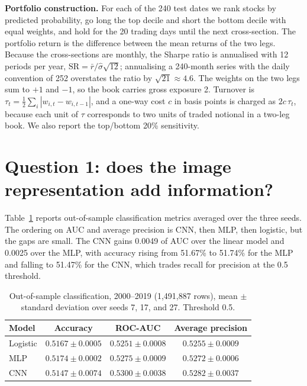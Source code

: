\documentclass[10pt]{article}
\begin{document}
\textbf{Portfolio construction.} For each of the 240 test dates we rank stocks by predicted probability, go long the top decile and short the bottom decile with equal weights, and hold for the 20 trading days until the next cross-section. The portfolio return is the difference between the mean returns of the two legs. Because the cross-sections are monthly, the Sharpe ratio is annualised with 12 periods per year, $\text{SR}=\bar r/\hat\sigma\sqrt{12}$; annualising a 240-month series with the daily convention of 252 overstates the ratio by $\sqrt{21}\approx4.6$. The weights on the two legs sum to $+1$ and $-1$, so the book carries gross exposure 2. Turnover is $\tau_t=\tfrac12\sum_i|w_{i,t}-w_{i,t-1}|$, and a one-way cost $c$ in basis points is charged as $2c\,\tau_t$, because each unit of $\tau$ corresponds to two units of traded notional in a two-leg book. We also report the top/bottom 20\% sensitivity.

\section{Question 1: does the image representation add information?}

Table~\ref{tab:classification} reports out-of-sample classification metrics averaged over the three seeds. The ordering on AUC and average precision is CNN, then MLP, then logistic, but the gaps are small. The CNN gains 0.0049 of AUC over the linear model and 0.0025 over the MLP, with accuracy rising from 51.67\% to 51.74\% for the MLP and falling to 51.47\% for the CNN, which trades recall for precision at the 0.5 threshold.

\begin{table}[t]
\centering
\small
\caption{Out-of-sample classification, 2000--2019 (1{,}491{,}887 rows), mean $\pm$ standard deviation over seeds 7, 17, and 27. Threshold 0.5.}
\label{tab:classification}
\begin{tabular}{lccc}
\toprule
Model & Accuracy & ROC-AUC & Average precision \\
\midrule
Logistic & $0.5167\pm0.0005$ & $0.5251\pm0.0008$ & $0.5255\pm0.0009$ \\
MLP      & $0.5174\pm0.0002$ & $0.5275\pm0.0009$ & $0.5272\pm0.0006$ \\
CNN      & $0.5147\pm0.0074$ & $0.5300\pm0.0038$ & $0.5282\pm0.0037$ \\
\bottomrule
\end{tabular}
\end{table}
\end{document}
